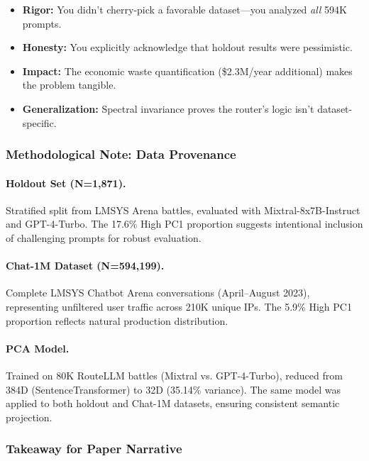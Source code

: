 \begin{itemize}[leftmargin=*,noitemsep,topsep=0pt]
    \item \textbf{Rigor:} You didn't cherry-pick a favorable dataset---you analyzed \emph{all} 594K prompts.
    \item \textbf{Honesty:} You explicitly acknowledge that holdout results were pessimistic.
    \item \textbf{Impact:} The economic waste quantification (\$2.3M/year additional) makes the problem tangible.
    \item \textbf{Generalization:} Spectral invariance proves the router's logic isn't dataset-specific.
\end{itemize}

\subsubsection{Methodological Note: Data Provenance}

\paragraph{Holdout Set (N=1,871).} Stratified split from LMSYS Arena battles, evaluated with Mixtral-8x7B-Instruct and GPT-4-Turbo. The 17.6\% High PC1 proportion suggests intentional inclusion of challenging prompts for robust evaluation.

\paragraph{Chat-1M Dataset (N=594,199).} Complete LMSYS Chatbot Arena conversations (April--August 2023), representing unfiltered user traffic across 210K unique IPs. The 5.9\% High PC1 proportion reflects natural production distribution.

\paragraph{PCA Model.} Trained on 80K RouteLLM battles (Mixtral vs. GPT-4-Turbo), reduced from 384D (SentenceTransformer) to 32D (35.14\% variance). The same model was applied to both holdout and Chat-1M datasets, ensuring consistent semantic projection.

\subsubsection{Takeaway for Paper Narrative}

